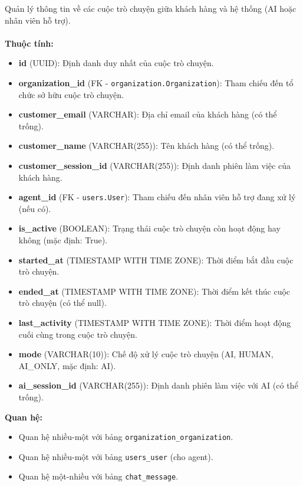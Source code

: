  Quản lý thông tin về các cuộc trò chuyện giữa khách hàng và hệ thống (AI hoặc nhân viên hỗ trợ). \\\\
\indent\textbf{Thuộc tính:}
\begin{itemize}
    \item \textbf{id} (UUID): Định danh duy nhất của cuộc trò chuyện.
    \item \textbf{organization\_id} (FK - \texttt{organization.Organization}): Tham chiếu đến tổ chức sở hữu cuộc trò chuyện.
    \item \textbf{customer\_email} (VARCHAR): Địa chỉ email của khách hàng (có thể trống).
    \item \textbf{customer\_name} (VARCHAR(255)): Tên khách hàng (có thể trống).
    \item \textbf{customer\_session\_id} (VARCHAR(255)): Định danh phiên làm việc của khách hàng.
    \item \textbf{agent\_id} (FK - \texttt{users.User}): Tham chiếu đến nhân viên hỗ trợ đang xử lý (nếu có).
    \item \textbf{is\_active} (BOOLEAN): Trạng thái cuộc trò chuyện còn hoạt động hay không (mặc định: True).
    \item \textbf{started\_at} (TIMESTAMP WITH TIME ZONE): Thời điểm bắt đầu cuộc trò chuyện.
    \item \textbf{ended\_at} (TIMESTAMP WITH TIME ZONE): Thời điểm kết thúc cuộc trò chuyện (có thể null).
    \item \textbf{last\_activity} (TIMESTAMP WITH TIME ZONE): Thời điểm hoạt động cuối cùng trong cuộc trò chuyện.
    \item \textbf{mode} (VARCHAR(10)): Chế độ xử lý cuộc trò chuyện (AI, HUMAN, AI\_ONLY, mặc định: AI).
    \item \textbf{ai\_session\_id} (VARCHAR(255)): Định danh phiên làm việc với AI (có thể trống).
\end{itemize}
\textbf{Quan hệ:}
\begin{itemize}
    \item Quan hệ nhiều-một với bảng \texttt{organization\_organization}.
    \item Quan hệ nhiều-một với bảng \texttt{users\_user} (cho agent).
    \item Quan hệ một-nhiều với bảng \texttt{chat\_message}.
\end{itemize}

